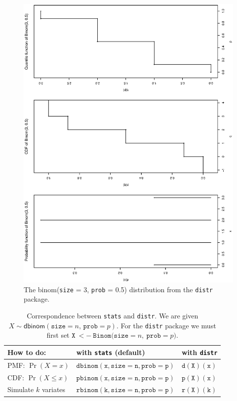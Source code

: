 \documentclass[captions=tableheading]{scrbook}
\begin{document}
\begin{figure}[th]
  \includegraphics[angle=270, totalheight=4in]{ps/discdist/binom-plot-distr.ps}
  \caption[The \textsf{binom}(\texttt{size} = 3, \texttt{prob} = 0.5) distribution from the \texttt{distr} package]{\small The \textsf{binom}(\texttt{size} = 3, \texttt{prob} = 0.5) distribution from the \texttt{distr} package.}
  \label{fig-binom-plot-distr}
\end{figure}


\begin{table}[htb]
\caption[Correspondence between =stats= and =distr=.]{Correspondence between \texttt{stats} and \texttt{distr}. We are given \(X\sim\mathsf{dbinom}(\mathtt{size}=n,\,\mathtt{prob}=p)\).  For the \texttt{distr} package we must first set \(\mathtt{X\ <-\ Binom(size=}n\mathtt{,\ prob=}p\mathtt{)}\).} 
\begin{center}
\begin{tabular}{lll}
 How to do:               &  with \texttt{stats} (default)         &  with \texttt{distr}   \\
\hline
 PMF: \(\Pr(X=x)\)        &  \(\mathtt{dbinom(x,size=n,prob=p)}\)  &  \(\mathtt{d(X)(x)}\)  \\
 CDF:  \(\Pr(X\leq x)\)   &  \(\mathtt{pbinom(x,size=n,prob=p)}\)  &  \(\mathtt{p(X)(x)}\)  \\
 Simulate \(k\) variates  &  \(\mathtt{rbinom(k,size=n,prob=p)}\)  &  \(\mathtt{r(X)(k)}\)  \\
\hline
\end{tabular}
\end{center}
\end{table}
\end{document}
